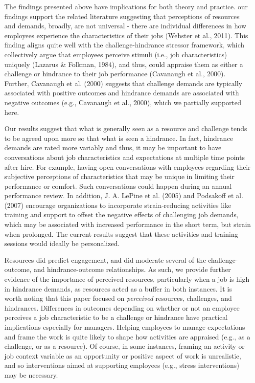 \documentclass[
  man]{apa7}
\begin{document}
The findings presented above have implications for both theory and practice. our findings support the related literature suggesting that perceptions of resources and demands, broadly, are not universal - there are individual differences in how employees experience the characteristics of their jobs (Webster et al., 2011). This finding aligns quite well with the challenge-hindrance stressor framework, which collectively argue that employees perceive stimuli (i.e., job characteristics) uniquely (Lazarus \& Folkman, 1984), and thus, could appraise them as either a challenge or hindrance to their job performance (Cavanaugh et al., 2000). Further, Cavanaugh et al. (2000) suggests that challenge demands are typically associated with positive outcomes and hindrance demands are associated with negative outcomes (e.g., Cavanaugh et al., 2000), which we partially supported here.

Our results suggest that what is generally seen as a resource and challenge tends to be agreed upon more so that what is seen a hindrance. In fact, hindrance demands are rated more variably and thus, it may be important to have conversations about job characteristics and expectations at multiple time points after hire. For example, having open conversations with employees regarding their subjective perceptions of characteristics that may be unique in limiting their performance or comfort. Such conversations could happen during an annual performance review. In addition, J. A. LePine et al. (2005) and Podsakoff et al. (2007) encourage organizations to incorporate strain-reducing activities like training and support to offset the negative effects of challenging job demands, which may be associated with increased performance in the short term, but strain when prolonged. The current results suggest that these activities and training sessions would ideally be personalized.

Resources did predict engagement, and did moderate several of the challenge-outcome, and hindrance-outcome relationships. As such, we provide further evidence of the importance of perceived resources, particularly when a job is high in hindrance demands, as resources acted as a buffer in both instances. It is worth noting that this paper focused on \emph{perceived} resources, challenges, and hindrances. Differences in outcomes depending on whether or not an employee perceives a job characteristic to be a challenge or hindrance have practical implications especially for managers. Helping employees to manage expectations and frame the work is quite likely to shape how activities are appraised (e.g., as a challenge, or as a resource). Of course, in some instances, framing an activity or job context variable as an opportunity or positive aspect of work is unrealistic, and so interventions aimed at supporting employees (e.g., stress interventions) may be necessary.
\end{document}
